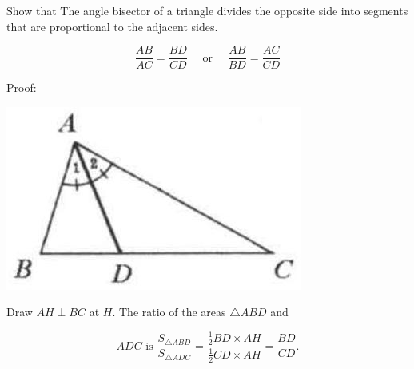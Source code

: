 \documentclass{article}
\begin{document}
Show that The angle bisector of a triangle divides the opposite side into segments that are proportional to the adjacent sides.

\[
\frac{A B}{A C}=\frac{B D}{C D} \quad \text { or } \quad \frac{A B}{B D}=\frac{A C}{C D}
\]

Proof:
\begin{center}
\includegraphics[width=\textwidth]{images/075.jpg}
\end{center}

Draw \(A H \perp B C\) at \(H\). The ratio of the areas \(\triangle A B D\) and

\[
A D C \text { is } \frac{S_{\triangle A B D}}{S_{\triangle A D C}}=\frac{\frac{1}{2} B D \times A H}{\frac{1}{2} C D \times A H}=\frac{B D}{C D} .
\]
\end{document}
